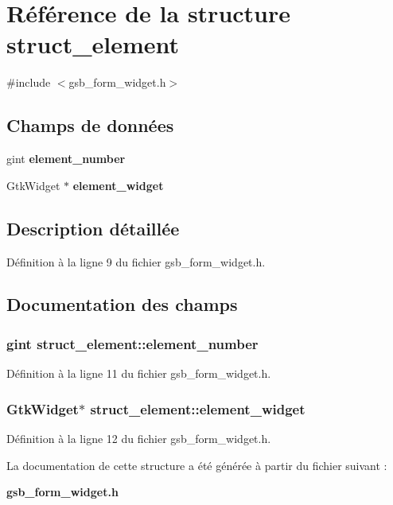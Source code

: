 \section{Référence de la structure struct\_\-element}
\label{structstruct__element}


{\ttfamily \#include $<$gsb\_\-form\_\-widget.h$>$}

\subsection*{Champs de données}
\begin{DoxyCompactItemize}
\item 
gint {\bf element\_\-number}
\item 
GtkWidget $\ast$ {\bf element\_\-widget}
\end{DoxyCompactItemize}


\subsection{Description détaillée}


Définition à la ligne 9 du fichier gsb\_\-form\_\-widget.h.



\subsection{Documentation des champs}
\subsubsection[{element\_\-number}]{\setlength{\rightskip}{0pt plus 5cm}gint {\bf struct\_\-element::element\_\-number}}\label{structstruct__element_a71253591ce0ff12ec3fd58fc9b1a401c}


Définition à la ligne 11 du fichier gsb\_\-form\_\-widget.h.

\subsubsection[{element\_\-widget}]{\setlength{\rightskip}{0pt plus 5cm}GtkWidget$\ast$ {\bf struct\_\-element::element\_\-widget}}\label{structstruct__element_a3709048e08a85c59c9414bbf57f58e27}


Définition à la ligne 12 du fichier gsb\_\-form\_\-widget.h.



La documentation de cette structure a été générée à partir du fichier suivant :\begin{DoxyCompactItemize}
\item 
{\bf gsb\_\-form\_\-widget.h}\end{DoxyCompactItemize}
